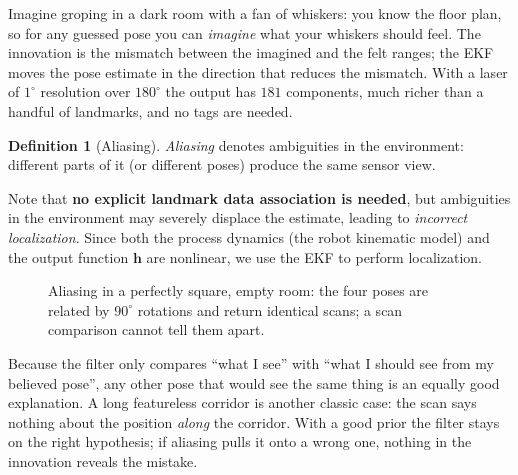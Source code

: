 \documentclass[11pt,a4paper]{article}
\theoremstyle{definition}
\newtheorem{definition}{Definition}[section]
\theoremstyle{plain}
\theoremstyle{remark}
\newcommand{\robot}[3][fill=white]{\begin{scope}[shift={(#2)},rotate=#3]\draw[#1,thick] (0.24,0)--(-0.16,0.15)--(-0.16,-0.15)--cycle;\end{scope}}
\begin{document}
\begin{intuition}
Imagine groping in a dark room with a fan of whiskers: you know the floor plan, so for any guessed pose you can \emph{imagine} what your whiskers should feel. The innovation is the mismatch between the imagined and the felt ranges; the EKF moves the pose estimate in the direction that reduces the mismatch. With a laser of $1^\circ$ resolution over $180^\circ$ the output has $181$ components, much richer than a handful of landmarks, and no tags are needed.
\end{intuition}

\begin{definition}[Aliasing]
\emph{Aliasing} denotes ambiguities in the environment: different parts of it (or different poses) produce the same sensor view.
\end{definition}

Note that \textbf{no explicit landmark data association is needed}, but ambiguities in the environment may severely displace the estimate, leading to \emph{incorrect localization}. Since both the process dynamics (the robot kinematic model) and the output function $\bm h$ are nonlinear, we use the EKF to perform localization.

\begin{figure}[H]
\centering
{}
\caption{Aliasing in a perfectly square, empty room: the four poses are related by $90^\circ$ rotations and return identical scans; a scan comparison cannot tell them apart.}
\label{fig:aliasing}
\end{figure}

\begin{intuition}
Because the filter only compares ``what I see'' with ``what I should see from my believed pose'', any other pose that would see the same thing is an equally good explanation. A long featureless corridor is another classic case: the scan says nothing about the position \emph{along} the corridor. With a good prior the filter stays on the right hypothesis; if aliasing pulls it onto a wrong one, nothing in the innovation reveals the mistake.
\end{intuition}
\end{document}
